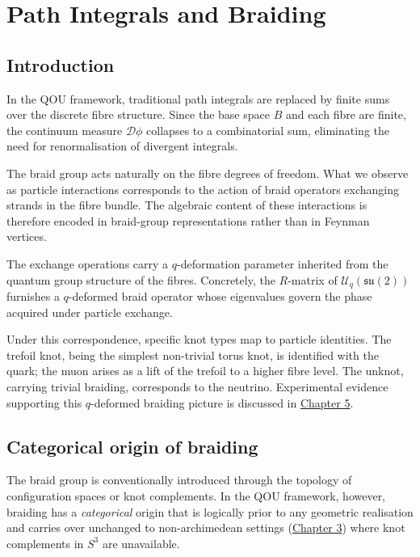 \chapter{Path Integrals and Braiding}
\label{chap:path-integrals-braiding}

\section{Introduction}
\label{sec:path-integrals-intro}

In the QOU framework, traditional path integrals are replaced by finite sums
over the discrete fibre structure.  Since the base space $B$ and each fibre are
finite, the continuum measure $\mathcal{D}\phi$ collapses to a combinatorial
sum, eliminating the need for renormalisation of divergent integrals.

The braid group acts naturally on the fibre degrees of freedom.  What we
observe as particle interactions corresponds to the action of braid operators
exchanging strands in the fibre bundle.  The algebraic content of these
interactions is therefore encoded in braid-group representations rather than in
Feynman vertices.

The exchange operations carry a $q$-deformation parameter inherited from the
quantum group structure of the fibres.  Concretely, the $R$-matrix of
$\mathcal{U}_q(\mathfrak{su}(2))$ furnishes a $q$-deformed braid operator
whose eigenvalues govern the phase acquired under particle exchange.

Under this correspondence, specific knot types map to particle identities.  The
trefoil knot, being the simplest non-trivial torus knot, is identified with the
quark; the muon arises as a lift of the trefoil to a higher fibre level.  The
unknot, carrying trivial braiding, corresponds to the neutrino.
Experimental evidence supporting this $q$-deformed braiding picture is
discussed in \hyperref[chap:experimental]{Chapter 5}.

\section{Categorical origin of braiding}
\label{sec:categorical-braiding}

The braid group is conventionally introduced through the topology of
configuration spaces or knot complements.  In the QOU framework, however,
braiding has a \emph{categorical} origin that is logically prior to any
geometric realisation and carries over unchanged to non-archimedean settings
(\hyperref[chap:p-adic]{Chapter 3}) where knot complements in $S^3$ are unavailable.

